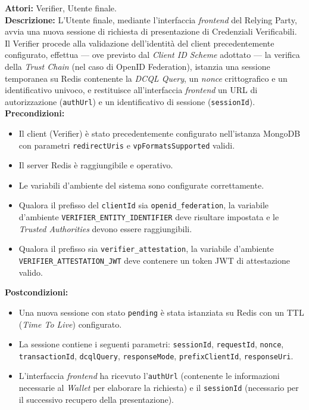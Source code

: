 \noindent\textbf{Attori:} Verifier, Utente finale.
\\
\textbf{Descrizione:} L'Utente finale, mediante l'interfaccia \textit{frontend} del Relying Party, avvia una nuova sessione di richiesta di presentazione di Credenziali Verificabili. Il Verifier procede alla validazione dell'identità del client precedentemente configurato, effettua — ove previsto dal \textit{Client ID Scheme} adottato — la verifica della \textit{Trust Chain} (nel caso di OpenID Federation), istanzia una sessione temporanea su Redis contenente la \textit{DCQL\glsfirstoccur{} Query}, un \textit{nonce} crittografico e un identificativo univoco, e restituisce all'interfaccia \textit{frontend} un URL di autorizzazione (\texttt{authUrl}) e un identificativo di sessione (\texttt{sessionId}).
\\
\textbf{Precondizioni:}
\begin{itemize}
    \item Il client (Verifier) è stato precedentemente configurato nell'istanza MongoDB con parametri \texttt{redirectUris} e \texttt{vpFormatsSupported} validi.
    \item Il server Redis è raggiungibile e operativo.
    \item Le variabili d'ambiente del sistema sono configurate correttamente.
    \item Qualora il prefisso del \texttt{clientId} sia \texttt{openid\_\allowbreak{}federation}, la variabile d'ambiente \texttt{VERIFIER\_\allowbreak{}ENTITY\_\allowbreak{}IDENTIFIER} deve risultare impostata e le \textit{Trusted Authorities} devono essere raggiungibili.
    \item Qualora il prefisso sia \texttt{verifier\_\allowbreak{}attestation}, la variabile d'ambiente \texttt{VERIFIER\_\allowbreak{}ATTESTATION\_\allowbreak{}JWT} deve contenere un token JWT di attestazione valido.
\end{itemize}
\noindent\textbf{Postcondizioni:}
\begin{itemize}
    \item Una nuova sessione con stato \texttt{pending} è stata istanziata su Redis con un TTL (\textit{Time To Live}) configurato.
    \item La sessione contiene i seguenti parametri: \texttt{sessionId}, \texttt{requestId}, \texttt{nonce}, \texttt{transactionId}, \texttt{dcqlQuery}, \texttt{responseMode}, \texttt{prefixClientId}, \texttt{responseUri}.
    \item L'interfaccia \textit{frontend} ha ricevuto l'\texttt{authUrl} (contenente le informazioni necessarie al \textit{Wallet} per elaborare la richiesta) e il \texttt{sessionId} (necessario per il successivo recupero della presentazione).
\end{itemize}

